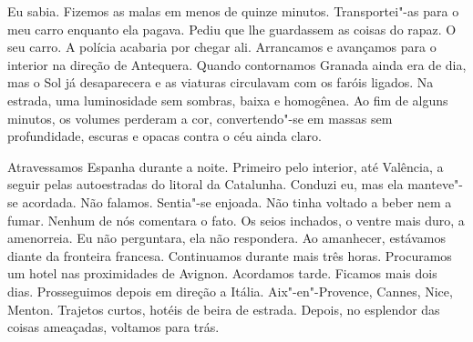 Eu sabia. Fizemos as malas em menos de quinze minutos. Transportei"-as
para o meu carro enquanto ela pagava. Pediu que lhe guardassem as coisas
do rapaz. O seu carro. A polícia acabaria por chegar ali. Arrancamos e
avançamos para o interior na direção de Antequera. Quando contornamos
Granada ainda era de dia, mas o Sol já desaparecera e as viaturas
circulavam com os faróis ligados. Na estrada, uma luminosidade sem
sombras, baixa e homogênea. Ao fim de alguns minutos, os volumes
perderam a cor, convertendo"-se em massas sem profundidade, escuras e
opacas contra o céu ainda claro.

Atravessamos Espanha durante a noite. Primeiro pelo interior, até
Valência, a seguir pelas autoestradas do litoral da Catalunha. Conduzi
eu, mas ela manteve"-se acordada. Não falamos. Sentia"-se enjoada. Não
tinha voltado a beber nem a fumar. Nenhum de nós comentara o fato. Os
seios inchados, o ventre mais duro, a amenorreia. Eu não perguntara, ela
não respondera. Ao amanhecer, estávamos diante da fronteira francesa.
Continuamos durante mais três horas. Procuramos um hotel nas
proximidades de Avignon. Acordamos tarde. Ficamos mais dois dias.
Prosseguimos depois em direção a Itália. Aix"-en"-Provence, Cannes,
Nice, Menton. Trajetos curtos, hotéis de beira de estrada. Depois, no
esplendor das coisas ameaçadas, voltamos para trás.
